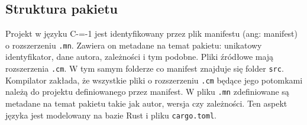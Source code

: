 \subsection{Struktura pakietu}\label{struktura_paczki}
Projekt w języku C-=-1 jest identyfikowany przez plik manifestu (ang: manifest) o rozszerzeniu \lstinline{.mn}. 
Zawiera on metadane na temat pakietu: unikatowy identyfikator, dane autora, zależności i tym podobne.
Pliki źródłowe mają rozszerzenia \lstinline{.cm}. W tym samym folderze co manifest znajduje się folder \lstinline{src}. Kompilator zakłada, że wszystkie pliki o rozszerzeniu \lstinline{.cm} będące jego potomkami należą do projektu definiowanego przez manifest.
W pliku \lstinline{.mn} zdefiniowane są metadane na temat pakietu takie jak autor, wersja czy zależności. Ten aspekt języka jest modelowany na bazie Rust i pliku \lstinline{cargo.toml}.
